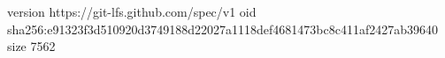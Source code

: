 version https://git-lfs.github.com/spec/v1
oid sha256:e91323f3d510920d3749188d22027a1118def4681473bc8c411af2427ab39640
size 7562
